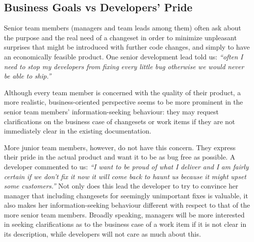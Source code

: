 \documentclass[12pt,oneside]{book}
\begin{document}


\subsection{Business Goals vs Developers' Pride}

Senior team members (managers and team leads among them) often ask about the purpose and the real need of a changeset in order to minimize unpleasant surprises that might be introduced with further code changes, and simply to have an economically feasible product. One senior development lead told us: \emph{``often I need to stop my developers from fixing every little bug otherwise we would never be able to ship.''}

Although every team member is concerned with the quality of their product, a more realistic, business-oriented perspective seems to be more prominent in the senior team members' information-seeking behaviour: they may request clarifications on the business case of changesets or work items if they are not immediately clear in the existing documentation.

More junior team members, however, do not have this concern. They express their pride in the actual product and want it to be as bug free as possible. A developer commented to us: \emph{``I want to be proud of what I deliver and I am fairly certain if we don't fix it now it will come back to haunt us because it might upset some customers.''} Not only does this lead the developer to try to convince her manager that including changesets for seemingly unimportant fixes is valuable, it also makes her information-seeking behaviour different with respect to that of the more senior team members. Broadly speaking, managers will be more interested in seeking clarifications as to the business case of a work item if it is not clear in its description, while developers will not care as much about this.

\end{document}
